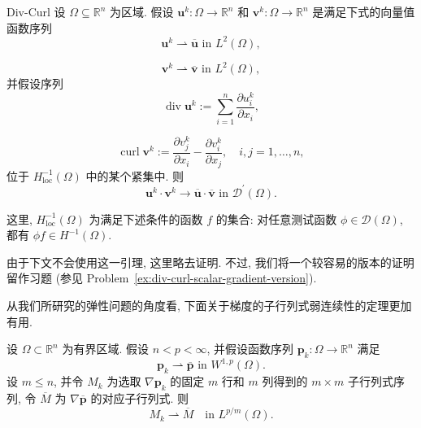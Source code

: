 \begin{Theorem}{Div-Curl}
\label{thm:div-curl-compact-negative-norm}
设 $\Omega\subseteq\mathbb{R}^n$ 为区域. 假设 $\bm{u}^k:\Omega\to\mathbb{R}^n$ 和 $\bm{v}^k:\Omega\to\mathbb{R}^n$ 是满足下式的向量值函数序列
\begin{equation}\label{eq:div-curl-first-vector-weak-limit}
\bm{u}^k\rightharpoonup\overline{\bm{u}}\text{ in }L^2(\Omega),
\end{equation}

\begin{equation}\label{eq:div-curl-second-vector-weak-limit}
\bm{v}^k\rightharpoonup\overline{\bm{v}}\text{ in }L^2(\Omega),
\end{equation}
并假设序列
\begin{equation}\label{eq:div-curl-divergence-sequence}
\operatorname{div}\bm{u}^k:=\sum_{i=1}^n\dfrac{\partial u_i^k}{\partial x_i},
\end{equation}

\begin{equation}\label{eq:div-curl-curl-sequence}
\operatorname{curl}\bm{v}^k:=\dfrac{\partial v_j^k}{\partial x_i}-\dfrac{\partial v_i^k}{\partial x_j},\quad i,j=1,\ldots,n,
\end{equation}
位于 $H_{\mathrm{loc}}^{-1}(\Omega)$ 中的某个紧集中. 则
\begin{equation}\label{eq:div-curl-product-distributional-limit}
\bm{u}^k\cdot\bm{v}^k\to\overline{\bm{u}}\cdot\overline{\bm{v}}\text{ in }\mathcal{D}^{\prime}(\Omega).
\end{equation}

\end{Theorem}

这里, $H_{\mathrm{loc}}^{-1}(\Omega)$ 为满足下述条件的函数 $f$ 的集合: 对任意测试函数 $\phi\in\mathcal{D}(\Omega)$, 都有 $\phi f\in H^{-1}(\Omega)$.

由于下文不会使用这一引理, 这里略去证明. 不过, 我们将一个较容易的版本的证明留作习题 (参见 Problem~\ref{ex:div-curl-scalar-gradient-version}).

从我们所研究的弹性问题的角度看, 下面关于梯度的子行列式弱连续性的定理更加有用.

\begin{Theorem}
\label{thm:gradient-minors-weak-continuity}
设 $\Omega\subset\mathbb{R}^n$ 为有界区域. 假设 $n<p<\infty$, 并假设函数序列 $\bm{p}_k:\Omega\to\mathbb{R}^n$ 满足
\begin{equation}\label{eq:gradient-minors-weak-sobolev-sequence}
\bm{p}_k\rightharpoonup\overline{\bm{p}}\text{ in }W^{1,p}(\Omega).
\end{equation}
设 $m\leq n$, 并令 $M_k$ 为选取 $\nabla\bm{p}_k$ 的固定 $m$ 行和 $m$ 列得到的 $m\times m$ 子行列式序列, 令 $\overline M$ 为 $\nabla\overline{\bm{p}}$ 的对应子行列式. 则
\begin{equation}\label{eq:gradient-minors-weak-lp-over-order-limit}
M_k\rightharpoonup\overline M\quad\text{in }L^{p/m}(\Omega).
\end{equation}

\end{Theorem}

